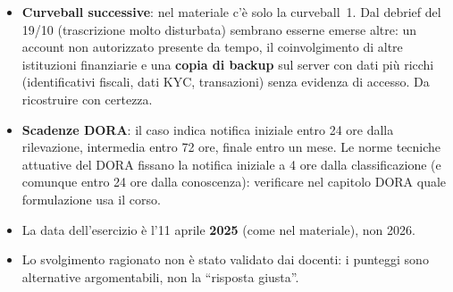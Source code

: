 \begin{verifica}
\begin{itemize}
  \item \textbf{Curveball successive}: nel materiale c'è solo la curveball~1. Dal debrief del 19/10
    (trascrizione molto disturbata) sembrano esserne emerse altre: un account non autorizzato presente
    da tempo, il coinvolgimento di altre istituzioni finanziarie e una \textbf{copia di backup} sul
    server con dati più ricchi (identificativi fiscali, dati KYC, transazioni) senza evidenza di
    accesso. Da ricostruire con certezza.
  \item \textbf{Scadenze DORA}: il caso indica notifica iniziale entro 24 ore dalla rilevazione,
    intermedia entro 72 ore, finale entro un mese. Le norme tecniche attuative del DORA fissano la
    notifica iniziale a 4 ore dalla classificazione (e comunque entro 24 ore dalla conoscenza):
    verificare nel capitolo DORA quale formulazione usa il corso.
  \item La data dell'esercizio è l'11 aprile \textbf{2025} (come nel materiale), non 2026.
  \item Lo svolgimento ragionato non è stato validato dai docenti: i punteggi sono alternative
    argomentabili, non la ``risposta giusta''.
\end{itemize}
\end{verifica}
